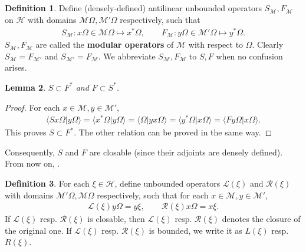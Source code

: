 \documentclass[12pt,b5paper,notitlepage]{article}
\theoremstyle{definition}
\newtheorem{df}{Definition}[section]
\theoremstyle{plain}
\newtheorem{lm}[df]{Lemma}
\newcommand{\mc}{\mathcal}
\newcommand{\bk}[1]{\langle {#1}\rangle}
\newcommand{\scr}{\mathscr}
\numberwithin{equation}{section}
\begin{document}
\subsection{}


\begin{df}
Define (densely-defined) antilinear unbounded operators $S_{\mc M},F_{\mc M}$ on $\mc H$ with domains $\mc M\Omega,\mc M'\Omega$ respectively, such that
\begin{gather*}
S_{\mc M}:x\Omega\in\mc M\Omega\mapsto x^*\Omega,\qquad F_{\mc M}:y\Omega\in\mc M'\Omega\mapsto y^*\Omega.	
\end{gather*}
$S_{\mc M},F_{\mc M}$ are called the \textbf{modular  operators}  of $\mc M$ with respect to $\Omega$. Clearly $S_{\mc M}=F_{\mc M'}$ and $S_{\mc M'}=F_{\mc M}$. We abbreviate $S_{\mc M},F_{\mc M}$ to $S,F$ when no confusion arises.
\end{df}




\begin{lm}
$S\subset F^*$ and $F\subset S^*$.
\end{lm}	




\begin{proof}
For each $x\in\mc M,y\in\mc M'$,
\begin{align*}
\bk{Sx\Omega|y\Omega}=\bk{x^*\Omega|y\Omega}=\bk{\Omega|yx\Omega}=\bk{y^*\Omega|x\Omega}=\bk{Fy\Omega|x\Omega}.	
\end{align*}
This proves $S\subset F^*$. The other relation can be proved in the same way.
\end{proof}

Consequently, $S$ and $F$ are closable (since their adjoints are densely defined). From now on, .

\begin{df}\label{lb92}
For each $\xi\in\mc H$, define unbounded operators $\scr L(\xi)$ and $\scr R(\xi)$ with domains $\mc M'\Omega,\mc M\Omega$ respectively, such that for each $x\in\mc M,y\in\mc M'$,
\begin{align*}
\scr L(\xi)y\Omega=y\xi,\qquad \scr R(\xi)x\Omega=x\xi.	
\end{align*}
If $\scr L(\xi)$ resp. $\scr R(\xi)$ is closable, then $\scr L(\xi)$ resp. $\scr R(\xi)$ denotes the closure of the original one. If $\scr L(\xi)$ resp. $\scr R(\xi)$ is bounded, we write it as $L(\xi)$ resp. $R(\xi)$. \index{LR@$\scr L(\xi),\scr R(\xi),L(\xi),R(\xi)$}
\end{df}
\end{document}

